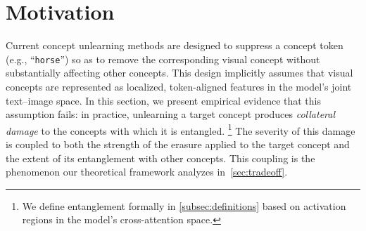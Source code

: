 \section{Motivation}
\label{sec:motivation} 
Current concept unlearning methods are designed to suppress a concept token (e.g., ``\texttt{horse}'') 
so as to remove the corresponding visual concept without substantially affecting other concepts. This design implicitly assumes that visual concepts are represented as localized, token-aligned features in the model's joint text--image space.
In this section, we present empirical evidence that this assumption fails: 
in practice, unlearning a target concept produces 
\emph{collateral damage} to the concepts with which it is entangled. 
\footnote{We define entanglement formally in \cref{subsec:definitions} based on activation regions in the model's cross-attention space.}
The severity of this damage is coupled to both the strength of the erasure applied to the target concept and the extent of its entanglement with other concepts.
This coupling is the phenomenon our theoretical framework analyzes in~\cref{sec:tradeoff}.


